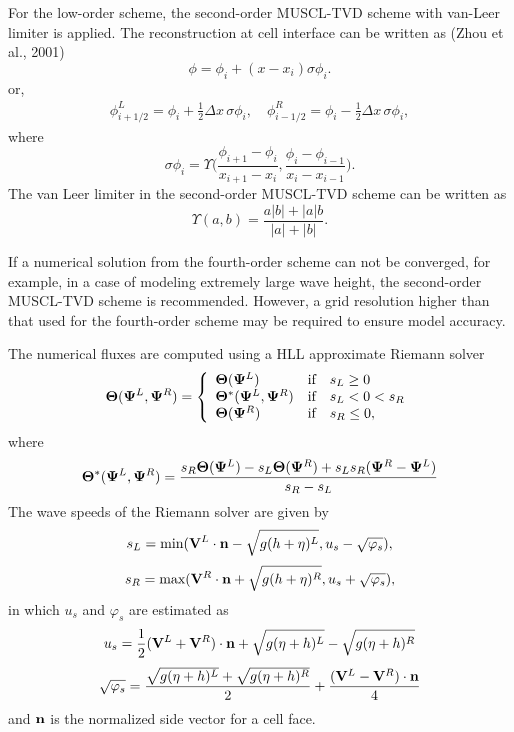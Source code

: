 \documentclass[11pt]{article}
\newcommand{\be}{\begin{equation}}
\newcommand{\ee}{\end{equation}}
\begin{document}
For the low-order scheme, the second-order MUSCL-TVD scheme with van-Leer limiter is applied.
The reconstruction at cell interface can be written as (Zhou et al., 2001)
\begin{equation}
  \phi = \phi_i + (x-x_i) \sigma \phi_i.
\end{equation}
or,
\begin{eqnarray}
  \phi_{i+1/2}^{L} = \phi_{i} + \frac{1}{2} \Delta x \, \sigma \phi_{i}, \quad
  \phi_{i-1/2}^{R} = \phi_{i} - \frac{1}{2} \Delta x \, \sigma \phi_{i},
\end{eqnarray}
where
\begin{equation}
  \sigma \phi_i
  = \Upsilon \bigg(
  \frac{\phi_{i+1}-\phi_{i}}{x_{i+1}-x_{i}},
  \frac{\phi_{i}-\phi_{i-1}}{x_{i}-x_{i-1}}
  \bigg).
\end{equation}
The van Leer limiter in the second-order MUSCL-TVD scheme can be written as
\begin{equation}
\Upsilon(a,b) = \frac{a|b| + |a|b}{|a|+|b|}.
\end{equation}

If a numerical solution from the fourth-order scheme can not be converged, for example, in a case of modeling extremely large wave height, the second-order MUSCL-TVD scheme is recommended.
However, a grid resolution higher than that used for the fourth-order scheme may be required to ensure model accuracy. 


The numerical fluxes are computed using a HLL approximate Riemann solver
\be
{\bf \Theta} ({\bf \Psi}^L, {\bf \Psi}^R)= \left \{ \begin{array}{ll} {\bf \Theta} ({\bf \Psi}^L) & \mbox{if} \ \ \ s_L \ge 0 \\
{\bf \Theta}^* ({\bf \Psi}^L, {\bf \Psi}^R) & \mbox{if} \ \ \ s_L < 0 < s_R \\
{\bf \Theta}({\bf \Psi}^R) & \mbox{if} \ \ \ s_R \le 0,
\end{array}  \right.
\ee
where
\be
{\bf \Theta^*} ({\bf \Psi}^L, {\bf \Psi}^R) = \frac{s_R {\bf \Theta} ({\bf \Psi}^L) -s_L {\bf \Theta}({\bf \Psi}^R) + s_L s_R ({\bf \Psi}^R - {\bf \Psi}^L)}{s_R - s_L}
\ee
The wave speeds of the Riemann solver are given by
\be
s_L= \mbox{min} ({\bf V}^L \cdot {\bf n} - \sqrt{g (h+\eta)^L} , u_s -\sqrt{\varphi_s}),  
\label{sl}
\ee
\be
s_R= \mbox{max} ({\bf V}^R \cdot {\bf n} + \sqrt{g (h+\eta)^R},  u_s +\sqrt{\varphi_s}),  
\label{sr}
\ee
in which $u_s$ and $\varphi_s$ are estimated as
\be
u_s =\frac{1}{2} ({\bf V}^L + {\bf V}^R)\cdot {\bf n} + \sqrt{g (\eta + h)^L} - \sqrt{g(\eta+h)^R}
\ee
\be
\sqrt{\varphi_s} = \frac{\sqrt{g (\eta + h)^L}+\sqrt{g (\eta + h)^R}}{2} +\frac{({\bf V}^L - {\bf V}^R)\cdot {\bf n}}{4}
\ee
and ${\bf n}$ is the normalized side vector for a cell face.
\end{document}
